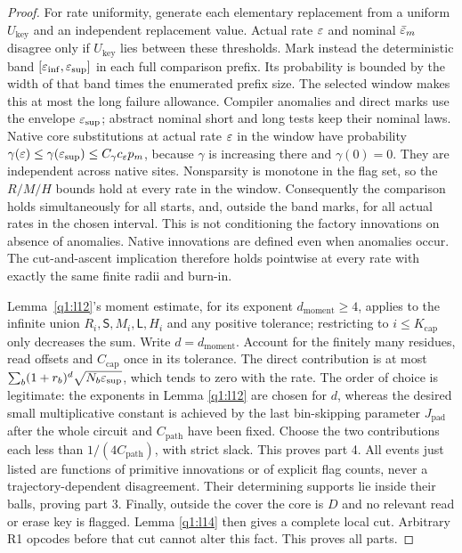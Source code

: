 \begin{proof}
For rate uniformity, generate each elementary replacement from a uniform \(U_{\mathrm{key}}\) and an independent replacement value. Actual rate \(\varepsilon\) and nominal \(\bar{\varepsilon}_{m}\) disagree only if \(U_{\mathrm{key}}\) lies between these thresholds. Mark instead the deterministic band \([\varepsilon_{\mathrm{inf}},\varepsilon_{\mathrm{sup}}]\) in each full comparison prefix. Its probability is bounded by the width of that band times the enumerated prefix size. The selected window makes this at most the long failure allowance. Compiler anomalies and direct marks use the envelope \(\varepsilon_{\mathrm{sup}}\); abstract nominal short and long tests keep their nominal laws. Native core substitutions at actual rate \(\varepsilon\) in the window have probability \(\gamma(\varepsilon)\le \gamma(\varepsilon_{\mathrm{sup}})\le C_{\gamma} c_{\varepsilon} p_{m}\), because \(\gamma\) is increasing there and \(\gamma(0)=0\). They are independent across native sites. Nonsparsity is monotone in the flag set, so the \(R/M/H\) bounds hold at every rate in the window. Consequently the comparison holds simultaneously for all starts, and, outside the band marks, for all actual rates in the chosen interval. This is not conditioning the factory innovations on absence of anomalies. Native innovations are defined even when anomalies occur. The cut-and-ascent implication therefore holds pointwise at every rate with exactly the same finite radii and burn-in.

Lemma~\ref{q1:l12}'s moment estimate, for its exponent \(d_{\mathrm{moment}}\ge4\), applies to the infinite union \(R_{i},\mathsf S,M_{i},\mathsf L,H_{i}\) and any positive tolerance; restricting to \(i\le K_{\mathrm{cap}}\) only decreases the sum. Write \(d=d_{\mathrm{moment}}\). Account for the finitely many residues, read offsets and \(C_{\mathrm{cap}}\) once in its tolerance. The direct contribution is at most \(\sum _{b} (1+r_{b})^{d} \sqrt{N_{b} \varepsilon_{\mathrm{sup}}}\), which tends to zero with the rate. The order of choice is legitimate: the exponents in Lemma \ref{q1:l12} are chosen for \(d\), whereas the desired small multiplicative constant is achieved by the last bin-skipping parameter \(J_{\mathrm{pad}}\) after the whole circuit and \(C_{\mathrm{path}}\) have been fixed. Choose the two contributions each less than \(1/(4C_{\mathrm{path}})\), with strict slack. This proves part 4. All events just listed are functions of primitive innovations or of explicit flag counts, never a trajectory-dependent disagreement. Their determining supports lie inside their balls, proving part 3. Finally, outside the cover the core is \(D\) and no relevant read or erase key is flagged. Lemma \ref{q1:l14} then gives a complete local cut. Arbitrary R1 opcodes before that cut cannot alter this fact. This proves all parts. 
\end{proof}

